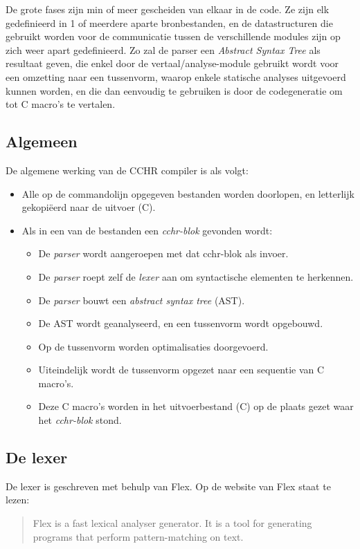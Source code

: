 De grote fases zijn min of meer gescheiden van elkaar in de code. Ze zijn elk gedefinieerd in 1 of meerdere aparte bronbestanden, en de datastructuren die gebruikt worden voor de communicatie tussen de verschillende modules zijn op zich weer apart gedefinieerd. Zo zal de parser een {\em Abstract Syntax Tree} als resultaat geven, die enkel door de vertaal/analyse-module gebruikt wordt voor een omzetting naar een tussenvorm, waarop enkele statische analyses uitgevoerd kunnen worden, en die dan eenvoudig te gebruiken is door de codegeneratie om tot C macro's te vertalen.

\subsection{Algemeen} \label{sec:comp-werking}

De algemene werking van de CCHR compiler is als volgt: \begin{itemize}
  \item Alle op de commandolijn opgegeven bestanden worden doorlopen, en letterlijk gekopi\"eerd naar de uitvoer (C).
  \item Als in een van de bestanden een {\em cchr-blok} gevonden wordt: \begin{itemize}
    \item De {\em parser} wordt aangeroepen met dat cchr-blok als invoer.
    \item De {\em parser} roept zelf de {\em lexer} aan om syntactische elementen te herkennen.
    \item De {\em parser} bouwt een {\em abstract syntax tree} (AST).
    \item De AST wordt geanalyseerd, en een tussenvorm wordt opgebouwd.
    \item Op de tussenvorm worden optimalisaties doorgevoerd.
    \item Uiteindelijk wordt de tussenvorm opgezet naar een sequentie van C macro's.
    \item Deze C macro's worden in het uitvoerbestand (C) op de plaats gezet waar het {\em cchr-blok} stond.
  \end{itemize}
\end{itemize}

\subsection{De lexer} \label{sec:lexer}

De lexer is geschreven met behulp van Flex. Op de website van Flex staat te lezen: \begin{quote}
  Flex is a fast lexical analyser generator. It is a tool for generating programs that perform pattern-matching on text.
\end{quote}

